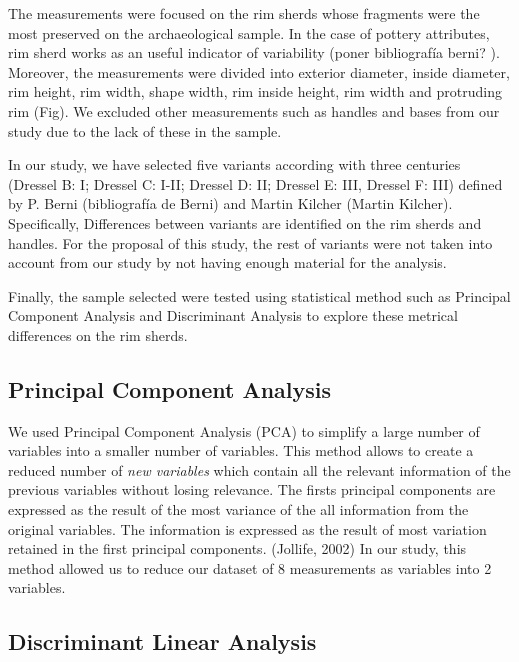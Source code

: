 \documentclass[review]{elsarticle}
\begin{document}
The measurements were focused on the rim sherds whose fragments were the most preserved on the archaeological sample. In the case of pottery attributes, rim sherd works as an useful indicator of variability (poner bibliografía berni? ). Moreover, the measurements were divided into exterior diameter, inside diameter, rim height, rim width, shape width, rim inside height, rim width and protruding rim (Fig). We excluded other measurements such as handles and bases from our study due to the lack of these in the sample.    

In our study, we have selected five variants according with three centuries (Dressel B: I; Dressel C: I-II; Dressel D: II; Dressel E: III, Dressel F: III) defined by P. Berni (bibliografía de Berni) and Martin Kilcher (Martin Kilcher). Specifically, Differences between variants are identified on the rim sherds and handles. For the proposal of this study, the rest of variants were not taken into account from our study by not having enough material for the analysis. 

Finally, the sample selected were tested using statistical method such as Principal Component Analysis and Discriminant Analysis to explore these metrical differences on the rim sherds. 
 

\subsection{Principal Component Analysis}


We used Principal Component Analysis (PCA) to simplify a large number of variables into a smaller number of variables. This method allows to create a reduced number of \textit{new variables} which contain all the relevant information of the previous variables without losing relevance. The firsts principal components are expressed as the result of the most variance of the all information from the original variables.  
The information is expressed as the result of most variation retained in the first principal components. (Jollife, 2002)
In our study, this method allowed us to reduce our dataset of 8 measurements as variables into 2 variables. 


\subsection{Discriminant Linear Analysis} 
\end{document}
